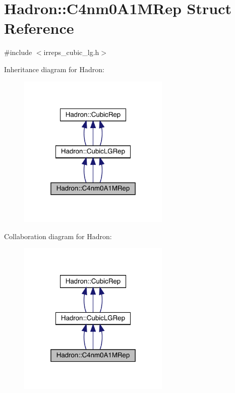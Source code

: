 \hypertarget{structHadron_1_1C4nm0A1MRep}{}\section{Hadron\+:\+:C4nm0\+A1\+M\+Rep Struct Reference}
\label{structHadron_1_1C4nm0A1MRep}


{\ttfamily \#include $<$irreps\+\_\+cubic\+\_\+lg.\+h$>$}



Inheritance diagram for Hadron\+:
\nopagebreak
\begin{figure}[H]
\begin{center}
\leavevmode
\includegraphics[width=205pt]{d0/da8/structHadron_1_1C4nm0A1MRep__inherit__graph}
\end{center}
\end{figure}


Collaboration diagram for Hadron\+:
\nopagebreak
\begin{figure}[H]
\begin{center}
\leavevmode
\includegraphics[width=205pt]{d4/de5/structHadron_1_1C4nm0A1MRep__coll__graph}
\end{center}
\end{figure}
